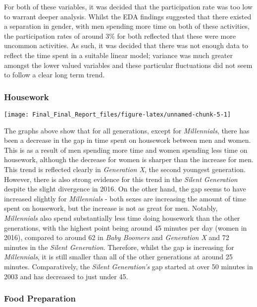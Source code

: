 \documentclass[11pt,]{article}
\begin{document}
For both of these variables, it was decided that the participation rate
was too low to warrant deeper analysis. Whilst the EDA findings
suggested that there existed a separation in gender, with men spending
more time on both of these activities, the participation rates of around
3\% for both reflected that these were more uncommon activities. As
such, it was decided that there was not enough data to reflect the time
spent in a suitable linear model; variance was much greater amongst the
lower valued variables and these particular fluctuations did not seem to
follow a clear long term trend.

\hypertarget{housework}{%
\subsubsection{Housework}\label{housework}}

\texttt{[image: Final\_Final\_Report\_files/figure-latex/unnamed-chunk-5-1]}

The graphs above show that for all generations, except for
\emph{Millennials}, there has been a decrease in the gap in time spent
on housework between men and women. This is as a result of men spending
more time and women spending less time on housework, although the
decrease for women is sharper than the increase for men. This trend is
reflected clearly in \emph{Generation X}, the second youngest
generation. However, there is also strong evidence for this trend in the
\emph{Silent Generation} despite the slight divergence in 2016. On the
other hand, the gap seems to have increased slightly for
\emph{Millennials} - both sexes are increasing the amount of time spent
on housework, but the increase is not as great for men. Notably,
\emph{Millennials} also spend substantially less time doing housework
than the other generations, with the highest point being around 45
minutes per day (women in 2016), compared to around 62 in \emph{Baby
Boomers} and \emph{Generation X} and 72 minutes in the \emph{Silent
Generation}. Therefore, whilst the gap is increasing for
\emph{Millennials}, it is still smaller than all of the other
generations at around 25 minutes. Comparatively, the \emph{Silent
Generation's} gap started at over 50 minutes in 2003 and has decreased
to just under 45.

\hypertarget{food-preparation}{%
\subsubsection{Food Preparation}\label{food-preparation}}
\end{document}

